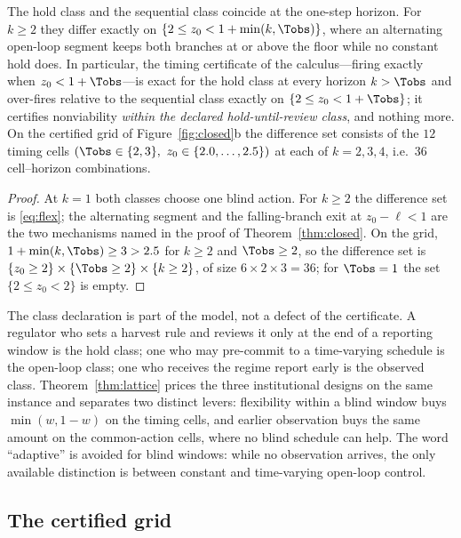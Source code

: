 \begin{corollary}\label{cor:timing}
The hold class and the sequential class coincide at the one-step horizon. For $k\ge2$ they differ exactly on $\{2\le z_0<1+\min(k,\Tobs)\}$, where an alternating open-loop segment keeps both branches at or above the floor while no constant hold does. In particular, the timing certificate of the calculus---firing exactly when $z_0<1+\Tobs$---is exact for the hold class at every horizon $k>\Tobs$ and over-fires relative to the sequential class exactly on $\{2\le z_0<1+\Tobs\}$; it certifies nonviability \emph{within the declared hold-until-review class}, and nothing more. On the certified grid of Figure~\ref{fig:closed}b the difference set consists of the $12$ timing cells $(\Tobs\in\{2,3\},\ z_0\in\{2.0,\dots,2.5\})$ at each of $k=2,3,4$, i.e.\ $36$ cell--horizon combinations.
\end{corollary}

\begin{proof}
At $k=1$ both classes choose one blind action. For $k\ge2$ the difference set is \eqref{eq:flex}; the alternating segment and the falling-branch exit at $z_0-\ell<1$ are the two mechanisms named in the proof of Theorem~\ref{thm:closed}. On the grid, $1+\min(k,\Tobs)\ge3>2.5$ for $k\ge2$ and $\Tobs\ge2$, so the difference set is $\{z_0\ge2\}\times\{\Tobs\ge2\}\times\{k\ge2\}$, of size $6\times2\times3=36$; for $\Tobs=1$ the set $\{2\le z_0<2\}$ is empty.
\end{proof}

\begin{remark}\label{rem:declaration}
The class declaration is part of the model, not a defect of the certificate. A regulator who sets a harvest rule and reviews it only at the end of a reporting window is the hold class; one who may pre-commit to a time-varying schedule is the open-loop class; one who receives the regime report early is the observed class. Theorem~\ref{thm:lattice} prices the three institutional designs on the same instance and separates two distinct levers: flexibility within a blind window buys $\min(w,1-w)$ on the timing cells, and earlier observation buys the same amount on the common-action cells, where no blind schedule can help. The word ``adaptive'' is avoided for blind windows: while no observation arrives, the only available distinction is between constant and time-varying open-loop control.
\end{remark}

\subsection{The certified grid}

